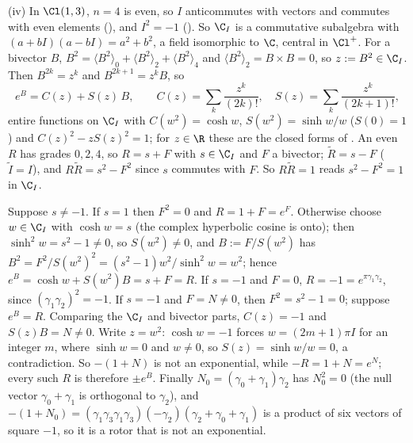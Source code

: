 (iv) In $\Cl(1,3)$, $n = 4$ is even, so $I$ anticommutes with vectors and commutes with even elements (), and $I^{2} = -1$ (). So $\C_I$ is a commutative subalgebra with $(a + bI)(a - bI) = a^{2} + b^{2}$, a field isomorphic to $\C$, central in $\Cl^{+}$. For a bivector $B$, $B^{2} = \langle B^{2}\rangle_0 + \langle B^{2}\rangle_2 + \langle B^{2}\rangle_4$ and $\langle B^{2}\rangle_2 = B \times B = 0$, so $z := B^{2} \in \C_I$. Then $B^{2k} = z^{k}$ and $B^{2k+1} = z^{k} B$, so
\[
e^{B} = C(z) + S(z)\, B, \qquad C(z) = \sum_k \frac{z^{k}}{(2k)!}, \quad S(z) = \sum_k \frac{z^{k}}{(2k+1)!},
\]
entire functions on $\C_I$ with $C(w^{2}) = \cosh w$, $S(w^{2}) = \sinh w / w$ ($S(0) = 1$) and $C(z)^{2} - z S(z)^{2} = 1$; for $z \in \R$ these are the closed forms of . An even $R$ has grades $0, 2, 4$, so $R = s + F$ with $s \in \C_I$ and $F$ a bivector; $\tilde R = s - F$ ($\tilde I = I$), and $R\tilde R = s^{2} - F^{2}$ since $s$ commutes with $F$. So $R\tilde R = 1$ reads $s^{2} - F^{2} = 1$ in $\C_I$.

Suppose $s \ne -1$. If $s = 1$ then $F^{2} = 0$ and $R = 1 + F = e^{F}$. Otherwise choose $w \in \C_I$ with $\cosh w = s$ (the complex hyperbolic cosine is onto); then $\sinh^{2} w = s^{2} - 1 \ne 0$, so $S(w^{2}) \ne 0$, and $B := F / S(w^{2})$ has $B^{2} = F^{2}/S(w^{2})^{2} = (s^{2} - 1) w^{2}/\sinh^{2} w = w^{2}$; hence $e^{B} = \cosh w + S(w^{2}) B = s + F = R$. If $s = -1$ and $F = 0$, $R = -1 = e^{\pi \gamma_1\gamma_2}$, since $(\gamma_1\gamma_2)^{2} = -1$. If $s = -1$ and $F = N \ne 0$, then $F^{2} = s^{2} - 1 = 0$; suppose $e^{B} = R$. Comparing the $\C_I$ and bivector parts, $C(z) = -1$ and $S(z) B = N \ne 0$. Write $z = w^{2}$: $\cosh w = -1$ forces $w = (2m + 1)\pi I$ for an integer $m$, where $\sinh w = 0$ and $w \ne 0$, so $S(z) = \sinh w / w = 0$, a contradiction. So $-(1 + N)$ is not an exponential, while $-R = 1 + N = e^{N}$; every such $R$ is therefore $\pm e^{B}$. Finally $N_0 = (\gamma_0 + \gamma_1)\gamma_2$ has $N_0^{2} = 0$ (the null vector $\gamma_0 + \gamma_1$ is orthogonal to $\gamma_2$), and $-(1 + N_0) = (\gamma_1\gamma_3\gamma_1\gamma_3)(-\gamma_2)(\gamma_2 + \gamma_0 + \gamma_1)$ is a product of six vectors of square $-1$, so it is a rotor that is not an exponential.
